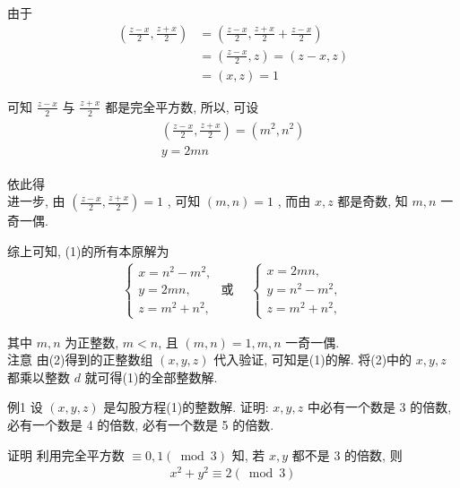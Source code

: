 由于\begin{align}
	\left(\frac{z-x}{2}, \frac{z+x}{2}\right) & =\left(\frac{z-x}{2}, \frac{z+x}{2}+\frac{z-x}{2}\right) \\
	                                          & =\left(\frac{z-x}{2}, z\right)=(z-x, z)                  \\
	                                          & =(x, z)=1
\end{align}

可知 $\frac{z-x}{2}$ 与 $\frac{z+x}{2}$ 都是完全平方数, 所以, 可设
\begin{align*}
	\begin{gathered}
		\left(\frac{z-x}{2}, \frac{z+x}{2}\right)=\left(m^{2}, n^{2}\right) \\
		y=2 m n
	\end{gathered}
\end{align*}

依此得\\
进一步, 由 $\left(\frac{z-x}{2}, \frac{z+x}{2}\right)=1$ , 可知 $(m, n)=1$ , 而由 $x ,  z$ 都是奇数, 知 $m, n$ 一奇一偶.

综上可知, (1)的所有本原解为
\begin{align*}
	\left\{\begin{array} { l }
		       { x = n ^ { 2 } - m ^ { 2 } , } \\
		       { y = 2 m n , }                 \\
		       { z = m ^ { 2 } + n ^ { 2 } , }
	       \end{array} \text { 或 } \quad \left\{\begin{array}{l}
		                                             x=2 m n,       \\
		                                             y=n^{2}-m^{2}, \\
		                                             z=m^{2}+n^{2},
	                                             \end{array}\right.\right.
\end{align*}

其中 $m ,  n$ 为正整数, $m<n$, 且 $(m, n)=1, m ,  n$ 一奇一偶.\\
注意 由(2)得到的正整数组 $(x, y, z)$ 代入验证, 可知是(1)的解. 将(2)中的 $x ,  y ,  z$ 都乘以整数 $d$ 就可得(1)的全部整数解.

例1 设 $(x, y, z)$ 是勾股方程(1)的整数解. 证明: $x ,  y ,  z$ 中必有一个数是 3 的倍数, 必有一个数是 4 的倍数, 必有一个数是 5 的倍数.

证明 利用完全平方数 $\equiv 0,1(\bmod 3)$ 知, 若 $x ,  y$ 都不是 3 的倍数, 则
\begin{align*}
	x^{2}+y^{2} \equiv 2(\bmod 3)
\end{align*}

